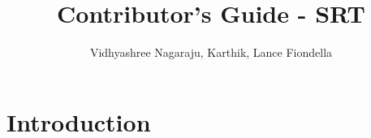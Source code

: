 \documentclass[journal]{IEEEtran}
\title{Contributor's Guide - SRT}
\author{Vidhyashree Nagaraju, Karthik, Lance Fiondella }
\begin{document}
\maketitle


\section{Introduction}
\end{document}
